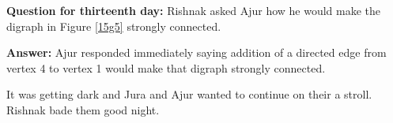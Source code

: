 \textbf{Question for thirteenth day:} Rishnak asked Ajur how he would make the digraph in Figure \ref{15g5} strongly connected. 

\textbf{Answer:} Ajur responded immediately saying  addition of a directed edge from vertex 4 to vertex 1 would make that digraph strongly connected.

It was getting dark and Jura and Ajur wanted to continue on their a stroll. Rishnak bade them good night.
